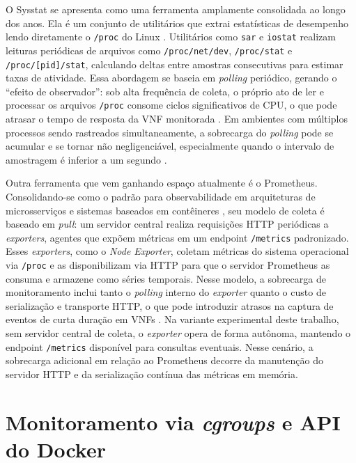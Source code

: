 O Sysstat se apresenta como uma ferramenta amplamente consolidada ao longo dos anos. Ela é um conjunto de utilitários que extrai estatísticas de desempenho lendo diretamente o \texttt{/proc} do Linux \cite{godard2024sysstat}. Utilitários como \texttt{sar} e \texttt{iostat} realizam leituras periódicas de arquivos como \texttt{/proc/net/dev}, \texttt{/proc/stat} e \texttt{/proc/[pid]/stat}, calculando deltas entre amostras consecutivas para estimar taxas de atividade. Essa abordagem se baseia em \textit{polling} periódico, gerando o ``efeito de observador'': sob alta frequência de coleta, o próprio ato de ler e processar os arquivos \texttt{/proc} consome ciclos significativos de CPU, o que pode atrasar o tempo de resposta da VNF monitorada \cite{10.1109/NOMS47738.2020.9110434}. Em ambientes com múltiplos processos sendo rastreados simultaneamente, a sobrecarga do \textit{polling} pode se acumular e se tornar não negligenciável, especialmente quando o intervalo de amostragem é inferior a um segundo \cite{10.1145/3452296.3472888}.

Outra ferramenta que vem ganhando espaço atualmente é o Prometheus. Consolidando-se como o padrão para observabilidade em arquiteturas de microsserviços e sistemas baseados em contêineres \cite{turnbull_prometheus_2018, usman_observability_2022}, seu modelo de coleta é baseado em \textit{pull}: um servidor central realiza requisições HTTP periódicas a \textit{exporters}, agentes que expõem métricas em um endpoint \texttt{/metrics} padronizado. Esses \textit{exporters}, como o \textit{Node Exporter}, coletam métricas do sistema operacional via \texttt{/proc} e as disponibilizam via HTTP para que o servidor Prometheus as consuma e armazene como séries temporais. Nesse modelo, a sobrecarga de monitoramento inclui tanto o \textit{polling} interno do \textit{exporter} quanto o custo de serialização e transporte HTTP, o que pode introduzir atrasos na captura de eventos de curta duração em VNFs \cite{10.1109/NOMS47738.2020.9110434}. Na variante experimental deste trabalho, sem servidor central de coleta, o \textit{exporter} opera de forma autônoma, mantendo o endpoint \texttt{/metrics} disponível para consultas eventuais. Nesse cenário, a sobrecarga adicional em relação ao Prometheus decorre da manutenção do servidor HTTP e da serialização contínua das métricas em memória.

\section{Monitoramento via \textit{cgroups} e API do Docker}
\label{sec:cgroups_docker}

